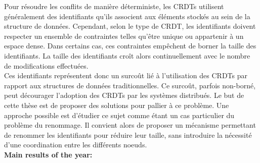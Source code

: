 \documentclass[12pt]{article}
\newcommand{\commentaire}[1]{}
\begin{document}
Pour résoudre les conflits de manière déterministe, les \acp{CRDT} utilisent généralement des identifiants qu'ils associent aux éléments stockés au sein de la structure de données.
Cependant, selon le type de \ac{CRDT}, les identifiants doivent respecter un ensemble de contraintes telles qu'être unique ou appartenir à un espace dense.
Dans certains cas, ces contraintes empêchent de borner la taille des identifiants.
La taille des identifiants croît alors continuellement avec le nombre de modifications effectuées.
\\

Ces identifiants représentent donc un surcoût lié à l'utilisation des \acp{CRDT} par rapport aux structures de données traditionnelles.
Ce surcoût, parfois non-borné, peut décourager l'adoption des \acp{CRDT} par les systèmes distribués.
Le but de cette thèse est de proposer des solutions pour pallier à ce problème.
Une approche possible est d'étudier ce sujet comme étant un cas particulier du problème du renommage.
Il convient alors de proposer un mécanisme permettant de renommer les identifiants pour réduire leur taille, sans introduire la nécessité d'une coordination entre les différents noeuds.
\\

\noindent\textbf{Main results of the year:}
\commentaire{%
  studies and works achieved, results obtained with respect to the
  objectives of the thesis; difficulties encountered}
\end{document}
